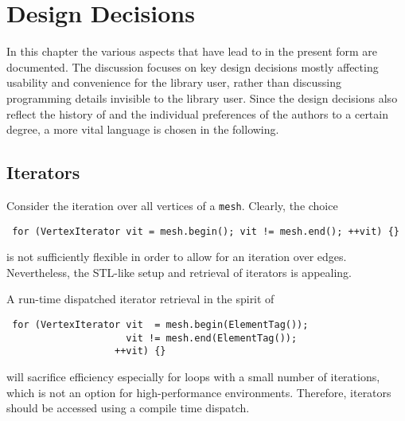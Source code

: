 \chapter{Design Decisions} \label{chap:design}

In this chapter the various aspects that have lead to {\ViennaGrid} in the present form are documented.
The discussion focuses on key design decisions mostly affecting usability and convenience for the library user,
rather than discussing programming details invisible to the library user. Since the design decisions also reflect
the history of {\ViennaGrid} and the individual preferences of the authors to a certain degree, a more vital language is chosen in the following.

 \section{Iterators}
 Consider the iteration over all vertices of a \lstinline|mesh|. Clearly, the choice
 \begin{lstlisting}
 for (VertexIterator vit = mesh.begin(); vit != mesh.end(); ++vit) {}
 \end{lstlisting}
 is not sufficiently flexible in order to allow for an iteration over edges.
 Nevertheless, the STL-like setup and retrieval of iterators is appealing.

 A run-time dispatched iterator retrieval in the spirit of
 \begin{lstlisting}
 for (VertexIterator vit  = mesh.begin(ElementTag());
                     vit != mesh.end(ElementTag());
                   ++vit) {}
 \end{lstlisting}
 will sacrifice efficiency especially for loops with a small number of iterations, which is not an option for high-performance environments.
 Therefore, iterators should be accessed using a compile time dispatch.

